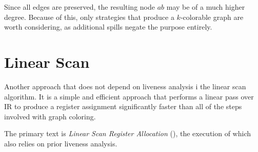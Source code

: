 \documentclass{article}
\begin{document}
Since all edges are preserved, the resulting node \(ab\) may be of a much higher degree. Because of this, only strategies that produce a \(k\)-colorable graph are worth considering, as additional spills negate the purpose entirely.

\section{Linear Scan}
Another approach that does not depend on liveness analysis i the linear scan algorithm.
It is a simple and efficient approach that performs a linear pass over IR to produce a register assignment significantly faster than all of the steps involved with graph coloring.

The primary text is \textit{Linear Scan Register Allocation} (\cite{linear}), the execution of which also relies on prior liveness analysis.


%





%
%
%
%
%
%


\end{document}
